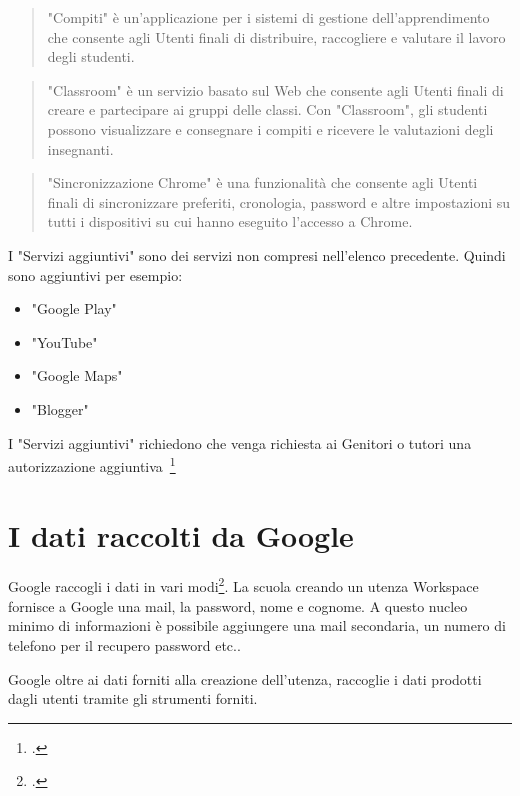 \begin{quotation}
	"Compiti" è un'applicazione per i sistemi di gestione dell'apprendimento che consente agli Utenti finali di distribuire, raccogliere e valutare il lavoro degli studenti.
\end{quotation}	
\begin{quotation}
\textenglish{"Classroom"} è un servizio basato sul Web che consente agli Utenti finali di creare e partecipare ai gruppi delle classi. Con \textenglish{"Classroom"}, gli studenti possono visualizzare e consegnare i compiti e ricevere le valutazioni degli insegnanti.
\end{quotation}
\begin{quotation}
	"Sincronizzazione  \textenglish{Chrome}" è una funzionalità che consente agli Utenti finali di sincronizzare preferiti, cronologia, password e altre impostazioni su tutti i dispositivi su cui hanno eseguito l'accesso a \textenglish{Chrome}.
\end{quotation}
I "Servizi aggiuntivi" sono dei servizi non compresi nell'elenco precedente. Quindi sono aggiuntivi per esempio:
\begin{itemize}
	\item \textenglish{"Google Play"}
	\item \textenglish{"YouTube"}
	\item \textenglish{"Google Maps"}
	\item \textenglish{"Blogger"}
\end{itemize}
I "Servizi aggiuntivi" richiedono che venga richiesta ai Genitori o tutori una autorizzazione aggiuntiva~\footcite{Google2022e} 
\section{I dati raccolti da Google}
\textenglish{Google} raccogli i dati in vari modi\footcite{Google2022a}. La scuola creando un utenza Workspace fornisce a Google una mail, la password,  nome e  cognome. A questo nucleo minimo di informazioni è possibile aggiungere una mail secondaria, un numero di telefono per il recupero password etc..

Google oltre ai dati forniti alla creazione dell'utenza, raccoglie i dati prodotti dagli utenti tramite gli strumenti forniti. 

